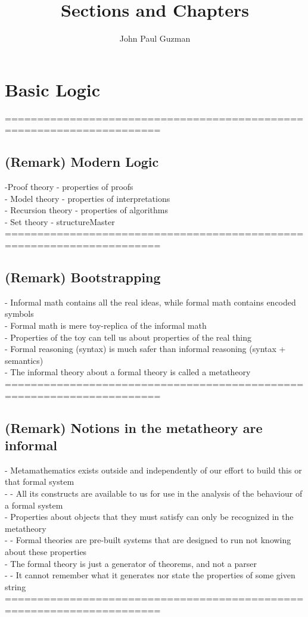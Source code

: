 \documentclass{article}
\title{Sections and Chapters}
\author{John Paul Guzman}
\date{ }
\begin{document}
\maketitle


\section{Basic Logic}
	======================================================================
\subsection{(Remark) Modern Logic}
	-Proof theory - properties of proofs \\
	- Model theory - properties of interpretations \\
	- Recursion theory - properties of algorithms \\
	- Set theory - structureMaster \\
	======================================================================
\subsection{(Remark) Bootstrapping}
	- Informal math contains all the real ideas, while formal math contains encoded symbols \\
	- Formal math is mere toy-replica of the informal math \\
	- Properties of the toy can tell us about properties of the real thing \\
	- Formal reasoning (syntax) is much safer than informal reasoning (syntax + semantics) \\
	- The informal theory about a formal theory is called a metatheory \\
	======================================================================
\subsection{(Remark) Notions in the metatheory are informal}
	- Metamathematics exists outside and independently of our effort to build this or that formal system \\
		- - All its constructs are available to us for use in the analysis of the behaviour of a formal system \\
	- Properties about objects that they must satisfy can only be recognized in the metatheory \\
		- - Formal theories are pre-built systems that are designed to run not knowing about these properties \\
	- The formal theory is just a generator of theorems, and not a parser \\
		- - It cannot remember what it generates nor state the properties of some given string \\
	======================================================================
\end{document}
